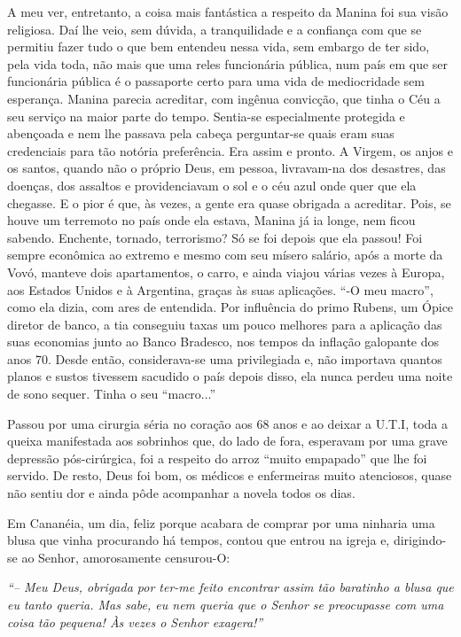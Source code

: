 A meu ver, entretanto, a coisa mais fantástica a respeito da Manina foi sua visão religiosa.
Daí lhe veio, sem dúvida, a tranquilidade e a confiança com que se permitiu fazer tudo o que bem entendeu nessa vida, sem embargo de ter sido, pela vida toda, não mais que uma reles funcionária pública, num país em que ser funcionária pública é o passaporte certo para uma vida de mediocridade sem esperança.
Manina parecia acreditar, com ingênua convicção, que tinha o Céu a seu serviço na maior parte do tempo.
Sentia-se especialmente protegida e abençoada e nem lhe passava pela cabeça perguntar-se quais eram suas credenciais para tão notória preferência.
Era assim e pronto.
A Virgem, os anjos e os santos, quando não o próprio Deus, em pessoa, livravam-na dos desastres, das doenças, dos assaltos e providenciavam o sol e o céu azul onde quer que ela chegasse.
E o pior é que, às vezes, a gente era quase obrigada a acreditar.
Pois, se houve um terremoto no país onde ela estava, Manina já ia longe, nem ficou sabendo.
Enchente, tornado, terrorismo? Só se foi depois que ela passou! Foi sempre econômica ao extremo e mesmo com seu mísero salário, após a morte da Vovó, manteve dois apartamentos, o carro, e ainda viajou várias vezes à Europa, aos Estados Unidos e à Argentina, graças às suas aplicações.
``-O meu macro'', como ela dizia, com ares de entendida.
Por influência do primo Rubens, um Ópice diretor de banco, a tia conseguiu taxas um pouco melhores para a aplicação das suas economias junto ao Banco Bradesco, nos tempos da inflação galopante dos anos 70.
Desde então, considerava-se uma privilegiada e, não importava quantos planos e sustos tivessem sacudido o país depois disso, ela nunca perdeu uma noite de sono sequer.
Tinha o seu ``macro...''

Passou por uma cirurgia séria no coração aos 68 anos e ao deixar a U.T.I, toda a queixa manifestada aos sobrinhos que, do lado de fora, esperavam por uma grave depressão pós-cirúrgica, foi a respeito do arroz ``muito empapado'' que lhe foi servido.
De resto, Deus foi bom, os médicos e enfermeiras muito atenciosos, quase não sentiu dor e ainda pôde acompanhar a novela todos os dias.

Em Cananéia, um dia, feliz porque acabara de comprar por uma ninharia uma blusa que vinha procurando há tempos, contou que entrou na igreja e, dirigindo-se ao Senhor, amorosamente censurou-O:

{\itshape``-- Meu Deus, obrigada por ter-me feito encontrar assim tão baratinho a blusa que eu tanto queria.
Mas sabe, eu nem queria que o Senhor se preocupasse com uma coisa tão pequena! Às vezes o Senhor exagera!''}

